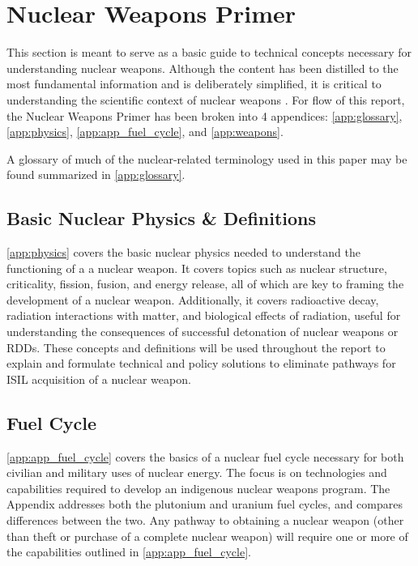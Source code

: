 \documentclass{report}
\begin{document}
\chapter{Nuclear Weapons Primer}


This section is meant to serve as a basic guide to technical concepts necessary for understanding nuclear weapons. Although the content has been distilled to the most fundamental information and is deliberately simplified, it is critical to understanding the scientific context of nuclear weapons \cite{Prussin2014}. For flow of this report, the Nuclear Weapons Primer has been broken into 4 appendices: \autoref{app:glossary}, \autoref{app:physics}, \autoref{app:app_fuel_cycle}, and \autoref{app:weapons}.





A glossary of much of the nuclear-related terminology used in this paper may be found summarized in  \autoref{app:glossary}.


\section{Basic Nuclear Physics \& Definitions} 


\autoref{app:physics}  covers the basic nuclear physics needed to understand the functioning of a a nuclear weapon. It covers topics such as nuclear structure, criticality, fission, fusion, and energy release, all of which are key to framing the development of a nuclear weapon. Additionally, it covers radioactive decay, radiation interactions with matter, and biological effects of radiation, useful for understanding the consequences of successful detonation of nuclear weapons or RDDs. These concepts and definitions will be used throughout the report to explain and formulate technical and policy solutions to eliminate pathways for ISIL acquisition of a nuclear weapon.






\section{Fuel Cycle} \label{sec:fuel_cycle}


\autoref{app:app_fuel_cycle}  covers the basics of a nuclear fuel cycle necessary for both civilian and military uses of nuclear energy. The focus is on technologies and capabilities required to develop an indigenous nuclear weapons program. The Appendix addresses both the plutonium and uranium fuel cycles, and compares differences between the two. Any pathway to obtaining a nuclear weapon (other than theft or purchase of a complete nuclear weapon) will require one or more of the capabilities outlined in \autoref{app:app_fuel_cycle}.
\end{document}
